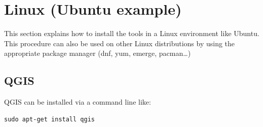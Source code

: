 \documentclass[10pt,a4paper]{article}
\begin{document}

\clearpage
\section{Linux (Ubuntu example)}

This section explains how to install the tools in a Linux environment like Ubuntu. This procedure can also be used on other Linux distributions by using the appropriate package manager (dnf, yum,
emerge, pacman\ldots)

\subsection{QGIS}
QGIS can be installed via a command line like:
\begin{verbatim}
sudo apt-get install qgis
\end{verbatim}
\end{document}
